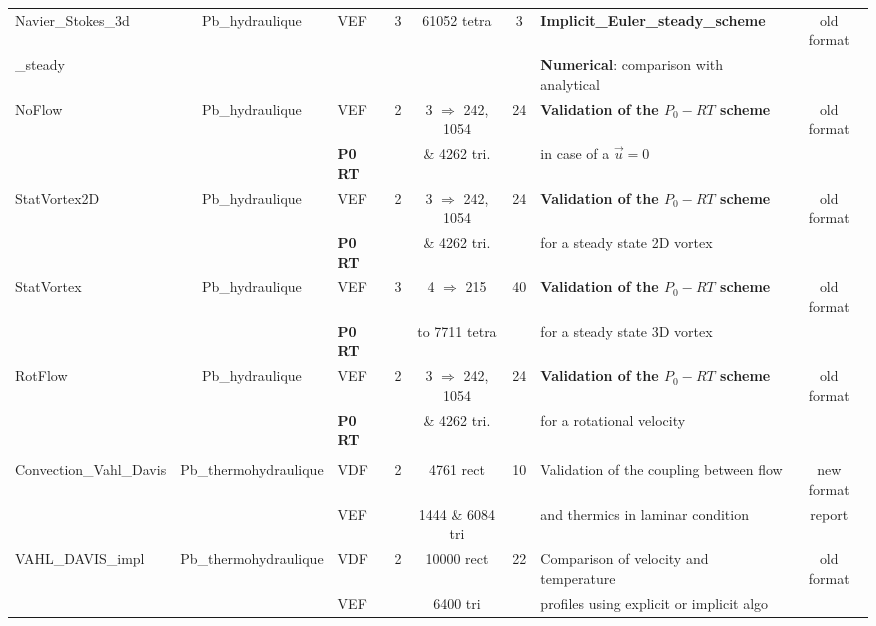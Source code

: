 \begin{table}[H]
\begin{centering}
\begin{tabular}{lclccclc}
\rowcolor{LimeGreen!10}Navier\_Stokes\_3d & Pb\_hydraulique & VEF & 3 & 61052 tetra & 3 & \textbf{Implicit\_Euler\_steady\_scheme} & old format \\ 
\rowcolor{LimeGreen!10}\_steady & & & & & & \textbf{Numerical}: comparison with analytical & \\ \hline
\rowcolor{LimeGreen!10}NoFlow & Pb\_hydraulique & VEF & 2 & 3 $\Rightarrow$ 242, 1054 & 24 & \textbf{Validation of the $P_0-RT$ scheme} & old format \\ 
\rowcolor{LimeGreen!10} & & \textbf{P0 RT} & & \& 4262 tri. & & in case of a $\vec{u}=0$ & \\ \hline
\rowcolor{LimeGreen!10}StatVortex2D & Pb\_hydraulique & VEF & 2 & 3 $\Rightarrow$ 242, 1054 & 24 & \textbf{Validation of the $P_0-RT$ scheme} & old format \\ 
\rowcolor{LimeGreen!10} & & \textbf{P0 RT} & & \& 4262 tri. & & for a steady state 2D vortex &  \\ \hline
\rowcolor{LimeGreen!10}StatVortex & Pb\_hydraulique & VEF & 3 & 4 $\Rightarrow$ 215 & 40 & \textbf{Validation of the $P_0-RT$ scheme} & old format \\ 
\rowcolor{LimeGreen!10} & & \textbf{P0 RT} & & to 7711 tetra & & for a steady state 3D vortex & \\ \hline
\rowcolor{LimeGreen!10}RotFlow & Pb\_hydraulique & VEF & 2 & 3 $\Rightarrow$ 242, 1054 & 24 & \textbf{Validation of the $P_0-RT$ scheme} & old format \\ 
\rowcolor{LimeGreen!10} & & \textbf{P0 RT} & & \& 4262 tri. & & for a rotational velocity & \\ \hline
\rowcolor{ForestGreen} \multicolumn{8}{c}{\textbf{Thermal Laminar Flow}} \\
\hline
\rowcolor{ForestGreen!10}Convection\_Vahl\_Davis & Pb\_thermohydraulique & VDF & 2 & 4761 rect & 10 & Validation of the coupling between flow & new format \\ 
\rowcolor{ForestGreen!10} & & VEF & & 1444 \& 6084 tri & & and thermics in laminar condition & report \\ \hline
\rowcolor{ForestGreen!10}VAHL\_DAVIS\_impl & Pb\_thermohydraulique & VDF & 2 & 10000 rect & 22 & Comparison of velocity and temperature & old format \\ 
\rowcolor{ForestGreen!10} & & VEF & & 6400 tri & & profiles using explicit or implicit algo & \\ \hline

	\end{tabular}
\end{centering}
\end{table}


